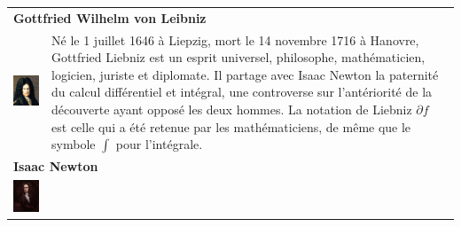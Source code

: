 \begin{tabular}{ll}
\multicolumn{2}{l}{\textbf{Gottfried Wilhelm von Leibniz}} \\[10pt]
\begin{minipage}{0.2\linewidth}
\includegraphics[scale=0.3]{images/Gottfried_Wilhelm_von_Leibniz.jpg}
\end{minipage}
&
\begin{minipage}{0.65\linewidth}
Né le  1 juillet 1646 à Liepzig, mort le 14 novembre 1716 à Hanovre, Gottfried Liebniz est un esprit universel,
philosophe, mathématicien, logicien, juriste et diplomate. Il partage avec Isaac Newton la paternité du calcul différentiel et intégral, une controverse sur l'antériorité de la découverte ayant opposé les deux hommes. La notation de Liebniz $\partial f$ est celle qui a été retenue par les mathématiciens, de même que le symbole $\int$ pour l'intégrale.
\end{minipage}\\
\multicolumn{2}{l}{\textbf{Isaac Newton}} \\[10pt]
\begin{minipage}{0.2\linewidth}
\includegraphics[scale=0.3]{images/isaac_newton.jpg}
\end{minipage}
& 
\begin{minipage}{0.65\linewidth}

\end{minipage}
\end{tabular}
